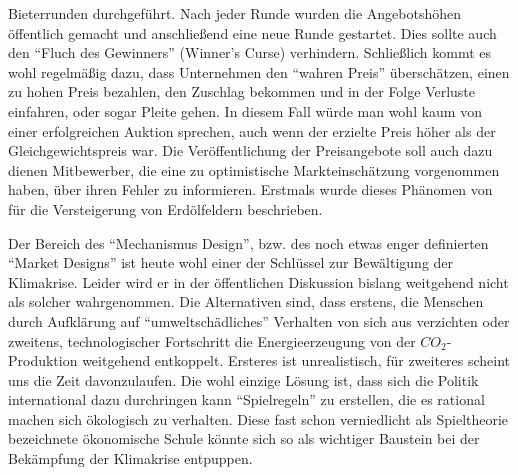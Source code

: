 Bieterrunden durchgeführt. Nach jeder Runde wurden die Angebotshöhen öffentlich gemacht und anschließend eine neue Runde gestartet. Dies sollte auch den "`Fluch des Gewinners"' (Winner's Curse) verhindern. Schließlich kommt es wohl regelmäßig dazu, dass Unternehmen den "`wahren Preis"' überschätzen, einen zu hohen Preis bezahlen, den Zuschlag bekommen und in der Folge Verluste einfahren, oder sogar Pleite gehen. In diesem Fall würde man wohl kaum von einer erfolgreichen Auktion sprechen, auch wenn der erzielte Preis höher als der Gleichgewichtspreis war. Die Veröffentlichung der Preisangebote soll auch dazu dienen Mitbewerber, die eine zu optimistische Markteinschätzung vorgenommen haben, über ihren Fehler zu informieren. Erstmals wurde dieses Phänomen von \textcite{Capen1971} für die Versteigerung von Erdölfeldern beschrieben.

Der Bereich des "`Mechanismus Design"', bzw. des noch etwas enger definierten "`Market Designs"' ist heute wohl einer der Schlüssel zur Bewältigung der Klimakrise. Leider wird er in der öffentlichen Diskussion bislang weitgehend nicht als solcher wahrgenommen. Die Alternativen sind, dass erstens, die Menschen durch Aufklärung auf "`umweltschädliches"' Verhalten von sich aus verzichten oder zweitens, technologischer Fortschritt die Energieerzeugung von der $CO_2$-Produktion weitgehend entkoppelt. Ersteres ist unrealistisch, für zweiteres scheint uns die Zeit davonzulaufen. Die wohl einzige Lösung ist, dass sich die Politik international dazu durchringen kann "`Spielregeln"' zu erstellen, die es rational machen sich ökologisch zu verhalten. Diese fast schon verniedlicht als Spieltheorie bezeichnete ökonomische Schule könnte sich so als wichtiger Baustein bei der Bekämpfung der Klimakrise entpuppen.